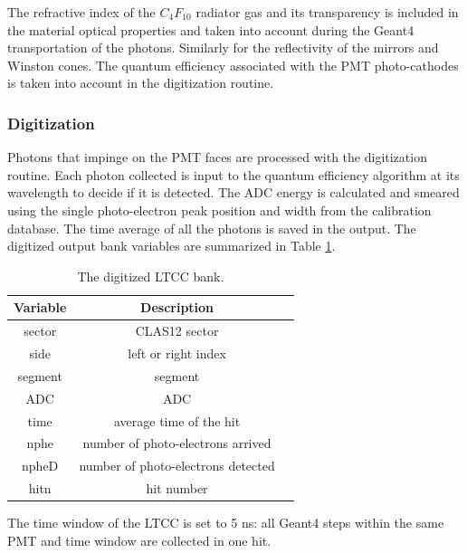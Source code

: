 The refractive index of the $C_4F_{10}$ radiator gas and its transparency is included in the material optical properties and taken
into account during the Geant4 transportation of the photons.
Similarly for the reflectivity of the mirrors and Winston cones.
The quantum efficiency associated with the PMT photo-cathodes is taken into account in
the digitization routine.

\subsubsection{Digitization}

Photons that impinge on the PMT faces are processed with the digitization routine.
Each photon collected is input to the quantum efficiency algorithm at its wavelength to decide if it is detected.
The ADC energy is calculated and smeared using the single photo-electron peak position and width from the calibration database.
The time average of all the photons is saved in the output.
The digitized output bank variables are summarized in Table \ref{tab:ltccBank}.

\begin{table}[h]
	\begin{center}
		\begin{tabular}{| c | c | c |}
			\hline \hline
			Variable & Description                                         \\
			\hline
             sector  &                                     CLAS12 sector   \\
               side  &                               left or right index   \\
            segment  &                                           segment   \\
                ADC  &                                               ADC   \\
               time  &                           average time of the hit   \\
               nphe  &                  number of photo-electrons arrived   \\
              npheD  &                 number of photo-electrons detected   \\
               hitn  &                                        hit number   \\
			\hline \hline
		\end{tabular}
	\end{center}
	\caption{The digitized LTCC bank.}\label{tab:ltccBank}
\end{table}

The time window  of the LTCC is set to 5 ns: all Geant4 steps within the same PMT and time window are collected in one hit.
